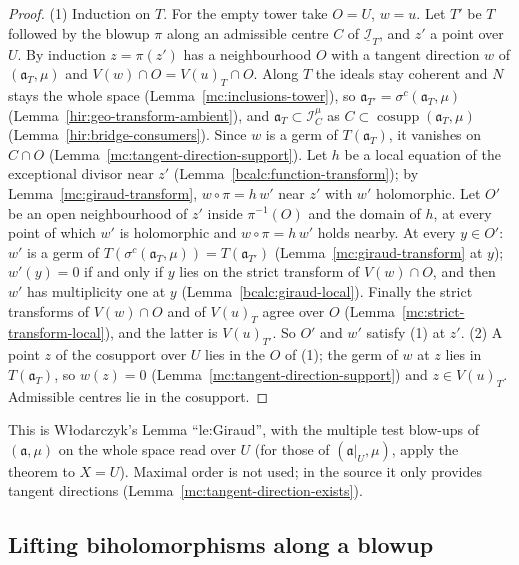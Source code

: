 \begin{proof}
\leanok
(1) Induction on \(T\). For the empty tower take \(O=U\), \(w=u\). Let \(T'\) be \(T\) followed by the blowup \(\pi\) along an admissible centre
\(C\) of \(\underline{\mathcal I}_T\), and \(z'\) a point over \(U\). By induction \(z=\pi(z')\) has a neighbourhood \(O\) with a tangent direction
\(w\) of \((\mathfrak a_T,\mu)\) and \(V(w)\cap O=V(u)_T\cap O\). Along \(T\) the ideals stay coherent and \(N\) stays the whole space
(Lemma~\ref{mc:inclusions-tower}), so \(\mathfrak a_{T'}=\sigma^c(\mathfrak a_T,\mu)\) (Lemma~\ref{hir:geo-transform-ambient}), and
\(\mathfrak a_T\subset\mathcal I_C^{\mu}\) as \(C\subset\operatorname{cosupp}(\mathfrak a_T,\mu)\) (Lemma~\ref{hir:bridge-consumers}). Since \(w\) is a germ of
\(T(\mathfrak a_T)\), it vanishes on \(C\cap O\) (Lemma~\ref{mc:tangent-direction-support}). Let \(h\) be a local equation of the exceptional
divisor near \(z'\) (Lemma~\ref{bcalc:function-transform}); by Lemma~\ref{mc:giraud-transform}, \(w\circ\pi=h\,w'\) near \(z'\) with \(w'\)
holomorphic. Let \(O'\) be an open neighbourhood of \(z'\) inside \(\pi^{-1}(O)\) and the domain of \(h\), at every point of which \(w'\) is
holomorphic and \(w\circ\pi=h\,w'\) holds nearby. At every \(y\in O'\): \(w'\) is a germ of \(T(\sigma^c(\mathfrak a_T,\mu))=T(\mathfrak a_{T'})\)
(Lemma~\ref{mc:giraud-transform} at \(y\)); \(w'(y)=0\) if and only if \(y\) lies on the strict transform of \(V(w)\cap O\), and then \(w'\) has
multiplicity one at \(y\) (Lemma~\ref{bcalc:giraud-local}). Finally the strict transforms of \(V(w)\cap O\) and of \(V(u)_T\) agree over \(O\)
(Lemma~\ref{mc:strict-transform-local}), and the latter is \(V(u)_{T'}\). So \(O'\) and \(w'\) satisfy (1) at \(z'\).
(2) A point \(z\) of the cosupport over \(U\) lies in the \(O\) of (1); the germ of \(w\) at \(z\) lies in \(T(\mathfrak a_T)\), so \(w(z)=0\)
(Lemma~\ref{mc:tangent-direction-support}) and \(z\in V(u)_T\). Admissible centres lie in the cosupport.
\end{proof}
This is Włodarczyk's Lemma ``le:Giraud'', with the multiple test blow-ups of \((\mathfrak a,\mu)\) on the whole space read over \(U\) (for those of
\((\mathfrak a|_U,\mu)\), apply the theorem to \(X=U\)). Maximal order is not used; in the source it only provides tangent directions
(Lemma~\ref{mc:tangent-direction-exists}).

\subsection{Lifting biholomorphisms along a blowup}

